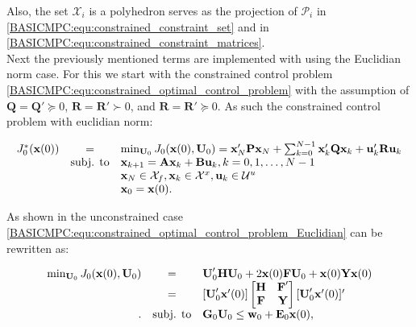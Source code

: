     Also, the set $\mathcal{X}_i$ is a polyhedron serves as the projection of $\mathcal{P}_i$ in \ref{BASICMPC:equ:constrained_constraint_set} and in \ref{BASICMPC:equ:constrained_constraint_matrices}.\\
    Next the previously mentioned terms are implemented with using the Euclidian norm case. For this we start with the constrained control problem \ref{BASICMPC:equ:constrained_optimal_control_problem} with the assumption of $\textbf{Q}=\textbf{Q}'\succeq0$, $\textbf{R}=\textbf{R}'\succ0$, and $\textbf{R}=\textbf{R}'\succeq0$. As such the constrained control problem with euclidian norm:

    \begin{equation}
        \begin{array}{rcl}
            J^*_0(\textbf{x}(0))&=&\min_{\textbf{U}_0}J_0(\textbf{x}(0),\textbf{U}_0)=
            \textbf{x}'_N\textbf{P}\textbf{x}_N+\sum^{N-1}_{k=0}\textbf{x}'_k\textbf{Q}\textbf{x}_k+\textbf{u}'_k\textbf{R}\textbf{u}_k\\
            &\textnormal{subj. to}&\textbf{x}_{k+1}=\textbf{Ax}_{k}+\textbf{Bu}_{k},k=0,1,\dots,N-1\\
            &&\textbf{x}_N\in\mathcal{X}_f,\textbf{x}_k\in\mathcal{X}^x,\textbf{u}_k\in\mathcal{U}^u\\
            &&\textbf{x}_0=\textbf{x}(0).
        \end{array}
        \label{BASICMPC:equ:constrained_optimal_control_problem_Euclidian}
    \end{equation}

    As shown in the unconstrained case \ref{BASICMPC:equ:constrained_optimal_control_problem_Euclidian} can be rewritten as:

\begin{equation}
    \begin{array}{rcl}
            \min_{\textbf{U}_0}J_0(\textbf{x}(0),\textbf{U}_0)&=& \textbf{U}'_0\textbf{H}\textbf{U}_0+2\textbf{x}(0)\textbf{F}\textbf{U}_0+\textbf{x}(0)\textbf{Y}\textbf{x}(0)\\
            &=&[\textbf{U}'_0\textbf{x}'(0)]
            \begin{bmatrix}
            \textbf{H}&\textbf{F}'\\
            \textbf{F}&\textbf{Y}\\
            \end{bmatrix}
            [\textbf{U}'_0\textbf{x}'(0)]'\\.
            &\textnormal{subj. to}&\textbf{G}_0\textbf{U}_0\leq\textbf{w}_0+\textbf{E}_0\textbf{x}(0),
        \end{array}
        \label{BASICMPC:equ:constrained_optimal_control_problem_Euclidian_second form}
    \end{equation}

